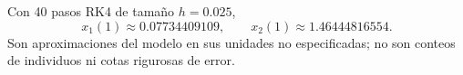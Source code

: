 Con 40 pasos RK4 de tamaño \(h=0.025\),
\[x_1(1)\approx0.07734409109,\qquad x_2(1)\approx1.46444816554.\]
Son aproximaciones del modelo en sus unidades no especificadas; no son conteos de individuos ni cotas rigurosas de error.
